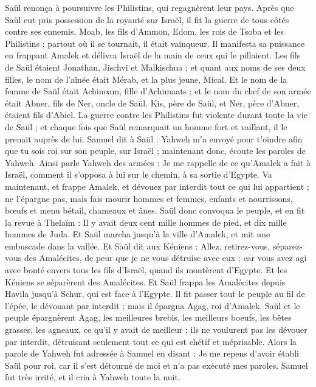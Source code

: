 \begin{multicols}{2}
Saül renonça à poursuivre les Philistins, qui regagnèrent leur pays.
Après que Saül eut pris possession de la royauté sur Israël, il fit la guerre de tous côtés contre ses ennemis, Moab, les fils d'Ammon, Edom, les rois de Tsoba et les Philistins ; partout où il se tournait, il était vainqueur.
Il manifesta sa puissance en frappant Amalek et délivra Israël de la main de ceux qui le pillaient.
Les fils de Saül étaient Jonathan, Jischvi et Malkischua ; et quant aux noms de ses deux filles, le nom de l'aînée était Mérab, et la plus jeune, Mical.
Et le nom de la femme de Saül était Achinoam, fille d'Achimaats ; et le nom du chef de son armée était Abner, fils de Ner, oncle de Saül.
Kis, père de Saül, et Ner, père d'Abner, étaient fils d'Abiel.
La guerre contre les Philistins fut violente durant toute la vie de Saül ; et chaque fois que Saül remarquait un homme fort et vaillant, il le prenait auprès de lui.
\VerseOne{}Samuel dit à Saül : Yahweh m'a envoyé pour t'oindre afin que tu sois roi sur son peuple, sur Israël ; maintenant donc, écoute les paroles de Yahweh.
Ainsi parle Yahweh des armées : Je me rappelle de ce qu'Amalek a fait à Israël, comment il s'opposa à lui sur le chemin, à sa sortie d'Egypte.
Va maintenant, et frappe Amalek, et dévouez par interdit tout ce qui lui appartient ; ne l'épargne pas, mais fais mourir hommes et femmes, enfants et nourrissons, bœufs et menu bétail, chameaux et ânes.
Saül donc convoqua le peuple, et en fit la revue à Thelaïm : Il y avait deux cent mille hommes de pied, et dix mille hommes de Juda.
Et Saül marcha jusqu'à la ville d'Amalek, et mit une embuscade dans la vallée.
Et Saül dit aux Kéniens : Allez, retirez-vous, séparez-vous des Amalécites, de peur que je ne vous détruise avec eux ; car vous avez agi avec bonté envers tous les fils d'Israël, quand ils montèrent d'Egypte. Et les Kéniens se séparèrent des Amalécites.
Et Saül frappa les Amalécites depuis Havila jusqu'à Schur, qui est face à l'Egypte.
Il fit passer tout le peuple au fil de l'épée, le dévouant par interdit ; mais il épargna Agag, roi d'Amalek.
Saül et le peuple épargnèrent Agag, les meilleures brebis, les meilleurs boeufs, les bêtes grasses, les agneaux, ce qu'il y avait de meilleur ; ils ne voulurent pas les dévouer par interdit, détruisant seulement tout ce qui est chétif et méprisable.
Alors la parole de Yahweh fut adressée à Samuel en disant :
Je me repens d'avoir établi Saül pour roi, car il s'est détourné de moi et n'a pas exécuté mes paroles. Samuel fut très irrité, et il cria à Yahweh toute la nuit.

\end{multicols}
